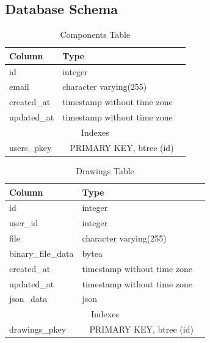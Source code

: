 \subsection{Database Schema}

\begin{table}[H]

    \begin{tabularx}{\textwidth}{ l l X }
      \toprule
      Column                 & Type                       \\
      \midrule
      id         & integer                     \\
      email      & character varying(255)      \\
      created\_at & timestamp without time zone \\
      updated\_at & timestamp without time zone \\
      \midrule
      \multicolumn{3}{c}{Indexes} \\
      \midrule
      users\_pkey & \multicolumn{2}{c}{PRIMARY KEY, btree (id)} \\
      \bottomrule
    \end{tabularx}

    \caption{Components Table}
    \label{table:db-components}
\end{table}

\begin{table}[H]

    \begin{tabularx}{\textwidth}{ l l X }
      \toprule
      Column           & Type                       \\
      \midrule
      id               & integer                     \\
      user\_id          & integer                     \\
      file             & character varying(255)      \\
      binary\_file\_data & bytea                       \\
      created\_at       & timestamp without time zone \\
      updated\_at       & timestamp without time zone \\
      json\_data        & json                        \\
      \midrule
      \multicolumn{3}{c}{Indexes} \\
      \midrule
      drawings\_pkey & \multicolumn{2}{c}{PRIMARY KEY, btree (id)} \\
      \bottomrule
    \end{tabularx}

    \caption{Drawings Table}
    \label{table:db-drawings}
\end{table}

